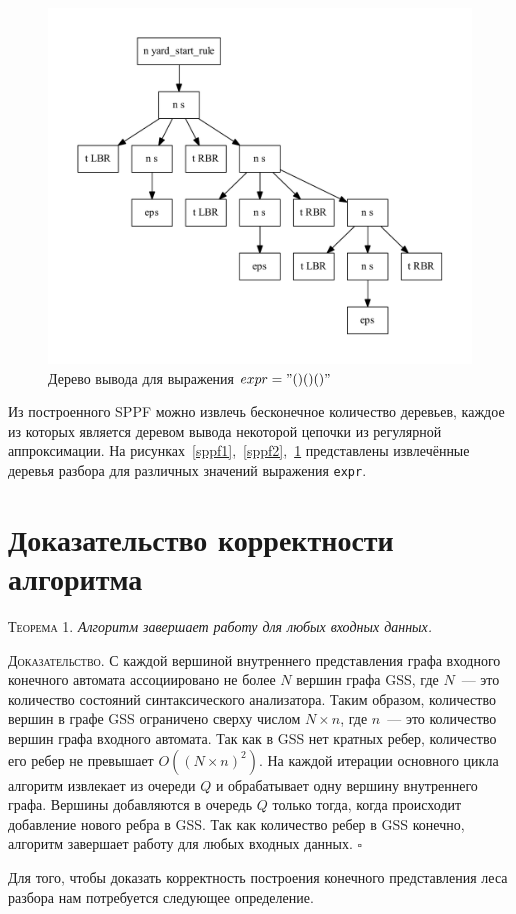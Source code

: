 \begin{figure}[!h]
 \centering
 \includegraphics[width=.7\textwidth]{pics/sppf3.pdf}
 \caption{Дерево вывода для выражения $expr="()()()"$}
 \label{sppf3}
\end{figure}

Из построенного SPPF можно извлечь бесконечное количество деревьев, каждое из которых является деревом вывода некоторой цепочки из регулярной аппроксимации. На рисунках~\ref{sppf1},~\ref{sppf2},~\ref{sppf3} представлены извлечённые деревья разбора для различных значений выражения \texttt{expr}.  


\section{Доказательство корректности алгоритма}

\textsc{Теорема 1.} 
\textit{Алгоритм завершает работу для любых входных данных.}

\textsc{Доказательство.}
С каждой вершиной внутреннего представления графа входного конечного автомата ассоциировано не более $N$ вершин графа GSS, где $N$~--- это количество состояний синтаксического анализатора. Таким образом, количество вершин в графе GSS ограничено сверху числом $N \times n$, где $n$~--- это количество вершин графа входного автомата. Так как в GSS нет кратных ребер, количество его ребер не превышает $O((N \times n)^{2})$. На каждой итерации основного цикла алгоритм извлекает из очереди $Q$ и обрабатывает одну вершину внутреннего графа. Вершины добавляются в очередь $Q$ только тогда, когда происходит добавление нового ребра в GSS. Так как количество ребер в GSS конечно, алгоритм завершает работу для любых входных данных. $\square$

Для того, чтобы доказать корректность построения конечного представления леса разбора нам потребуется следующее определение. 

